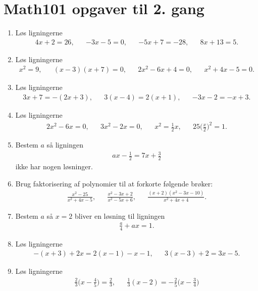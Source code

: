 \newpage
\section{Math101 opgaver til 2. gang}
\begin{enumerate}
\item Løs ligningerne
\begin{align*}
4x+2=26,&& -3x-5=0,&&-5x+7=-28,&& 8x+13=5.
\end{align*}

\item Løs ligningerne
\begin{align*}
x^2=9,&&(x-3)(x+7)=0,&& 2x^2-6x+4=0,&& x^2+4x-5=0.
\end{align*}

\item Løs ligningerne
\begin{align*}
3x+7=-(2x+3),&& 3(x-4)=2(x+1),&& -3x-2=-x+3.
\end{align*}

\item Løs ligningerne
\begin{align*}
2x^2-6x=0,&& 3x^2-2x=0,&& x^2=\frac{1}{2}x,&& 25\Big(\frac{x}{2}\Big)^2= 1.
\end{align*}

\item Bestem $a$ så ligningen 
\begin{align*}
ax-\frac{1}{2}=7x+\frac{3}{2}
\end{align*}
ikke har nogen løsninger. 

\item Brug faktorisering af polynomier til at forkorte følgende brøker:
\begin{align*}
\frac{x^2-25}{x^2+4x-5},&&\frac{x^2-3x+2}{x^2-5x+6},&& \frac{(x+2)(x^2-3x-10)}{x^2+4x+4}.
\end{align*}

\item Bestem $a$ så $x=2$ bliver en løsning til ligningen
\begin{align*}
\frac{a}{4}+ax=1.
\end{align*}

\item Løs ligningerne
\begin{align*}
-(x+3)+2x=2(x-1)-x-1 ,&& 3(x-3)+2=3x-5.
\end{align*}


\item Løs ligningerne
\begin{align*}
\frac{2}{3}\Big(x- \frac{4}{5}\Big)=\frac{2}{3},&& \frac{1}{3}(x-2)=-\frac{2}{5}\Big(x-\frac{3}{4}\Big)
\end{align*}


\end{enumerate}
